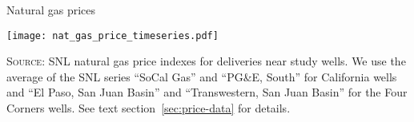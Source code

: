\caption{Natural gas prices}
\label{fig:nat-gas-price-timeseries}
\texttt{[image: nat\_gas\_price\_timeseries.pdf]}

\textsc{Source:}
\gls{SNL} natural gas price indexes for deliveries near study wells.
We use the average of the \gls{SNL} series ``SoCal Gas'' and ``PG\&E, South'' for California wells and
``El Paso, San Juan Basin'' and ``Transwestern, San Juan Basin'' for the Four Corners wells.
See text section~\ref{sec:price-data} for details.
